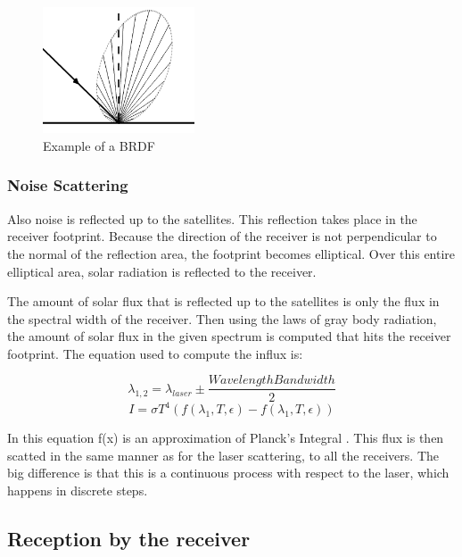 \begin{figure}[ht!]
\centering
\includegraphics[width=0.4\textwidth]{chapters/img/scatter.png}
\caption{Example of a \ac{BRDF}}
\label{fig:scatter}
\end{figure}

\subsubsection{Noise Scattering}

Also noise is reflected up to the satellites. This reflection takes place in the receiver footprint. Because the direction of the receiver is not perpendicular to the normal of the reflection area, the footprint becomes elliptical. Over this entire elliptical area, solar radiation is reflected to the receiver.

The amount of solar flux that is reflected up to the satellites is only the flux in the spectral width of the receiver. Then using the laws of gray body radiation, the amount of solar flux in the given spectrum is computed that hits the receiver footprint. The equation used to compute the influx is:

\begin{equation}
	\lambda_{1,2} = \lambda _{laser} \pm \frac{Wavelength Bandwidth}{2}
\end{equation}
\begin{equation}
	I = \sigma T^4 (f(\lambda _1, T, \epsilon) - f(\lambda _1, T, \epsilon))
\end{equation}

In this equation f(x) is an approximation of Planck's Integral \cite[p.~26]{rees}. This flux is then scatted in the same manner as for the laser scattering, to all the receivers. The big difference is that this is a continuous process with respect to the laser, which happens in discrete steps.

\subsection{Reception by the receiver}

